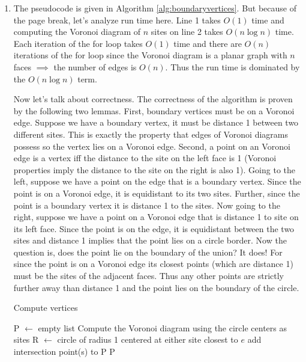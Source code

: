 \documentclass[11pt]{article}
\begin{document}
\answer
\begin{enumerate}
    \item The pseudocode is given in Algorithm \ref{alg:boundaryvertices}.
    But because of the page break, let's analyze run time here.
    Line 1 takes $O(1)$ time and computing the Voronoi diagram of $n$ sites on line 2 takes $O(n \log n)$ time.
    Each iteration of the for loop takes $O(1)$ time and there are $O(n)$ iterations of the for loop since the Voronoi diagram is a planar graph with $n$ faces $\implies$ the number of edges is $O(n)$.
    Thus the run time is dominated by the $O(n \log n)$ term.

    Now let's talk about correctness.
    The correctness of the algorithm is proven by the following two lemmas.
    First, boundary vertices must be on a Voronoi edge.
    Suppose we have a boundary vertex, it must be distance 1 between two different sites.
    This is exactly the property that edges of Voronoi diagrams possess so the vertex lies on a Voronoi edge.
    Second, a point on an Voronoi edge is a vertex iff the distance to the site on the left face is 1 (Voronoi properties imply the distance to the site on the right is also 1).
    Going to the left, suppose we have a point on the edge that is a boundary vertex.
    Since the point is on a Voronoi edge, it is equidistant to its two sites.
    Further, since the point is a boundary vertex it is distance 1 to the sites.
    Now going to the right, suppose we have a point on a Voronoi edge that is distance 1 to site on its left face.
    Since the point is on the edge, it is equidistant between the two sites and distance 1 implies that the point lies on a circle border.
    Now the question is, does the point lie on the boundary of the union?
    It does!
    For since the point is on a Voronoi edge its closest points (which are distance 1) must be the sites of the adjacent faces.
    Thus any other points are strictly further away than distance 1 and the point lies on the boundary of the circle.

    \begin{algorithm}
    \caption{Compute vertices}
    \label{alg:boundaryvertices}
    \begin{algorithmic}[1]
        \State P $\gets$ empty list
        \State Compute the Voronoi diagram using the circle centers as sites
            \State R $\gets$ circle of radius 1 centered at either site closest to $e$
                \State add intersection point(s) to P
            \EndIf
        \EndFor
        \State \Return P
    \EndFunction
    \end{algorithmic}
    \end{algorithm}


\end{enumerate}
\end{document}
